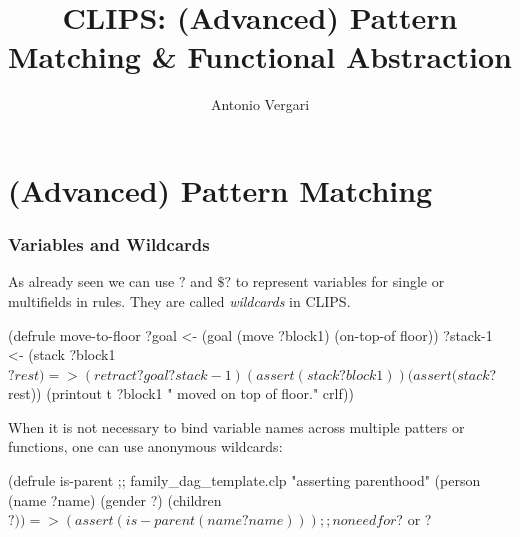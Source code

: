 \documentclass[xcolor={usenames,dvipsnames,svgnames}, compress]{beamer}
\begin{document}
\title{CLIPS:  (Advanced) Pattern Matching \& Functional Abstraction}
\author{Antonio Vergari}

\footnotesize \let\small\footnotesize





{
  \begin{frame}
    \titlepage
  \end{frame}
}





\section{(Advanced) Pattern Matching}
{
  \begin{frame}
    \sectionpage
  \end{frame}
}

\begin{frame}[fragile]
  \frametitle{Variables and Wildcards}
  As already seen we can use $?$ and $\$?$ to represent variables for
  single or multifields in rules. They are called \emph{wildcards} in CLIPS.
  \begin{clips-code}[numbers=none]
    (defrule move-to-floor
        ?goal <- (goal (move ?block1) (on-top-of floor))
        ?stack-1 <- (stack ?block1 $?rest)
        =>
        (retract ?goal ?stack-1)
        (assert (stack ?block1))
        (assert (stack $?rest))
        (printout t ?block1 " moved on top of floor." crlf))    
      \end{clips-code}

  When it is not necessary to bind variable names across multiple patters
  or functions, one can use anonymous wildcards:
  \begin{clips-code}[numbers=none]
    (defrule is-parent ;; family_dag_template.clp
        "asserting parenthood"
        (person (name ?name) (gender ?) (children $?))
        =>
        (assert (is-parent (name ?name))) ;; no need for $? or ? 
  \end{clips-code}
\end{frame}
\end{document}
